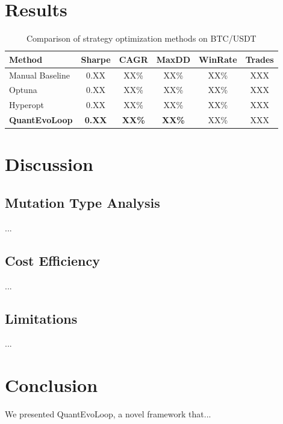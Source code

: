 \documentclass[11pt,a4paper]{article}
\begin{document}
\section{Results}
\label{sec:results}

\begin{table}[h]
\centering
\caption{Comparison of strategy optimization methods on BTC/USDT}
\label{tab:results}
\begin{tabular}{lccccc}
\toprule
Method & Sharpe & CAGR & MaxDD & WinRate & Trades \\
\midrule
Manual Baseline     & 0.XX & XX\% & XX\% & XX\% & XXX \\
Optuna              & 0.XX & XX\% & XX\% & XX\% & XXX \\
Hyperopt            & 0.XX & XX\% & XX\% & XX\% & XXX \\
\textbf{QuantEvoLoop} & \textbf{0.XX} & \textbf{XX\%} & \textbf{XX\%} & XX\% & XXX \\
\bottomrule
\end{tabular}
\end{table}

\section{Discussion}
\label{sec:discussion}

\subsection{Mutation Type Analysis}
...

\subsection{Cost Efficiency}
...

\subsection{Limitations}
...

\section{Conclusion}
\label{sec:conclusion}

We presented QuantEvoLoop, a novel framework that...
\end{document}
